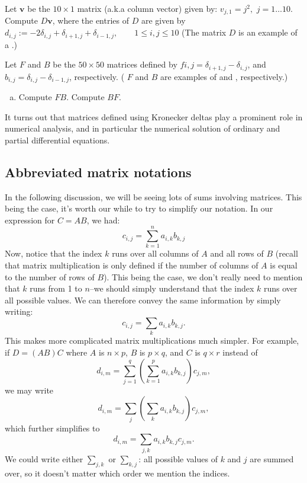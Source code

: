 \begin{exercise}{}
Let $\mathbf{v}$ be the $10 \times 1$ matrix (a.k.a column vector) given by:  $v_{j,1} = j^2,$ $j=1 \ldots 10$. Compute $D\mathbf{v}$, where 
the entries of $D$ are given by 
$\displaystyle  d_{i,j} := -2\delta_{i,j} + \delta_{i+1,j} + \delta_{i-1,j}, \qquad 1 \le i,j \le 10$
(The matrix $D$ is an example of a .)
\end{exercise}

\begin{exercise}{}
Let $F$ and $B$ be the $50 \times 50$ matrices defined by  $f{i,j} = \delta_{i+1,j} - \delta_{i,j}$, and $b_{i,j} = \delta_{i,j}-\delta_{i-1,j}$, respectively.  ( $F$ and $B$ are examples of   and , respectively.)
\begin{enumerate}[(a)]
\item
Compute $FB$.
Compute $BF$. 
\end{enumerate}
\end{exercise}


It turns out that matrices defined using Kronecker deltas play a prominent role in numerical analysis, and in particular the numerical solution of ordinary and partial differential equations.
\subsection{Abbreviated matrix notations}
In the following discussion, we will be seeing lots of sums involving matrices. This being the case, it's worth our while to try to simplify our notation. In our expression for $C=AB$, we had:
\[ {c}_{i,j}= \sum_{k=1}^n a_{i,k} b_{k,j} \]
Now, notice that the index $k$ runs over all columns of $A$ and all rows of $B$  (recall that matrix multiplication is only defined if the number of columns of $A$ is equal to the number of rows of $B$). This being the case, we don't really need to mention that $k$ runs from 1 to $n$--we should simply understand that the index $k$ runs over all possible values. We can therefore convey the same information by simply writing:
\[ {c}_{i,j}= \sum_{k} a_{i,k} b_{k,j}. \]
This makes more complicated matrix multiplications much simpler. For example, if $D = (AB)C$ where $A$ is $n \times p$, $B$ is $p \times q$, and $C$ is $q \times r$ instead of
\[ {d}_{i,m}= \sum_{j=1}^q \left( \sum_{k=1}^p a_{i,k} b_{k,j} \right) c_{j,m}, \]
 we may write
\[ {d}_{i,m}= \sum_{j} \left( \sum_{k} a_{i,k} b_{k,j} \right) c_{j,m}, \]
which further simplifies to
\[ {d}_{i,m}= \sum_{j,k}  a_{i,k} b_{k,j} c_{j,m}. \]
We could write either $\sum_{j,k}$ or $\sum_{k,j}$:  all possible values of $k$ and $j$ are summed over, so it doesn't matter which order we mention the indices.

